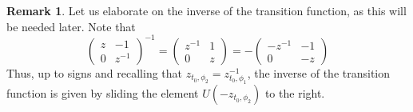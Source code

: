 \documentclass[a4paper, 11pt]{amsart}
\theoremstyle{definition}
\newtheorem{remark}[theorem]{Remark}
\begin{document}
\begin{remark}\label{rmk:sliding-inverse}
    Let us elaborate on the inverse of the transition function, as this will be needed later. Note that
    \[
    \begin{pmatrix} z & -1 \\ 0 & z^{-1} \end{pmatrix}^{-1} = \begin{pmatrix} z^{-1} & 1 \\ 0 & z\end{pmatrix} = -\begin{pmatrix} -z^{-1} & -1 \\ 0 & -z\end{pmatrix}
    \]
    Thus, up to signs and recalling that $z_{t_0, \phi_2} = z_{t_0, \phi_1}^{-1}$, the inverse of the transition function is given by sliding the element $U(-z_{t_0, \phi_2})$ to the right. 
\end{remark}
\end{document}
